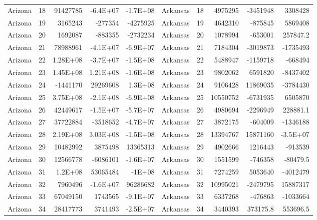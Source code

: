 \begin{table}[]
\begin{tabular}{lrrrrlrrrr}
		Arizona &  18 & 91427785 & -6.4E+07 & -1.7E+08 & Arkansas &  18 & 4975295 & -3451948 & 3308428 \\
		Arizona &  19 & 3165243 & -277354 & -4275925 & Arkansas &  19 & 4642310 & -875845 & 5869408 \\
		Arizona &  20 & 1692087 & -883355 & -2732234 & Arkansas &  20 & 1078994 & -653001 & 257847.2 \\
		Arizona &  21 & 78988961 & -4.1E+07 & -6.9E+07 & Arkansas &  21 & 7184304 & -3019873 & -1735493 \\
		Arizona &  22 & 1.28E+08 & -3.7E+07 & -1.5E+08 & Arkansas &  22 & 5488947 & -1159718 & -668494 \\
		Arizona &  23 & 1.45E+08 & 1.21E+08 & -1.6E+08 & Arkansas &  23 & 9802062 & 6591820 & -8437402 \\
		Arizona &  24 & -1441170 & 29269608 & 1.3E+08 & Arkansas &  24 & 9106428 & 11869035 & -3784430 \\
		Arizona &  25 & 3.75E+08 & -2.1E+08 & -6.9E+08 & Arkansas &  25 & 10550752 & -6731935 & 6505870 \\
		Arizona &  26 & 42449617 & -1.5E+07 & -5.7E+07 & Arkansas &  26 & 4980694 & -2296949 & 228881.1 \\
		Arizona &  27 & 37722884 & -3518652 & -4.7E+07 & Arkansas &  27 & 3872175 & -604009 & -1346188 \\
		Arizona &  28 & 2.19E+08 & 3.03E+08 & -1.5E+08 & Arkansas &  28 & 13394767 & 15871160 & -3.5E+07 \\
		Arizona &  29 & 10482992 & 3875498 & 13365313 & Arkansas &  29 & 4902666 & 1216443 & -913539 \\
		Arizona &  30 & 12566778 & -6086101 & -1.6E+07 & Arkansas &  30 & 1551599 & -746358 & -80479.5 \\
		Arizona &  31 & 1.2E+08 & 53065484 & -1E+08 & Arkansas &  31 & 7274259 & 5053640 & -4012479 \\
		Arizona &  32 & 7960496 & -1.6E+07 & 96286682 & Arkansas &  32 & 10995021 & -2479795 & 15887317 \\
		Arizona &  33 & 67049150 & 1743565 & -9.1E+07 & Arkansas &  33 & 6337268 & -476863 & -1033664 \\
		Arizona &  34 & 28417773 & 3741493 & -2.5E+07 & Arkansas &  34 & 3440393 & 373175.8 & 553696.5
	\end{tabular}
\end{table}

